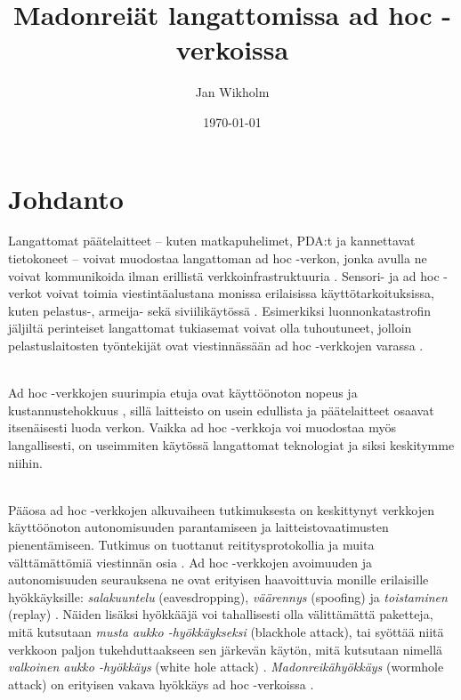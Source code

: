 \documentclass[finnish]{tktltiki2}
\title{Madonreiät langattomissa ad hoc -verkoissa}
\author{Jan Wikholm}
\date{\today}
\theoremstyle{definition}
\theoremstyle{remark}
\begin{document}

\frontmatter      %

\maketitle        %
\makeabstract     %

\tableofcontents  %


\mainmatter       %

\section{Johdanto}



Langattomat päätelaitteet -- kuten matkapuhelimet, PDA:t ja kannettavat tietokoneet -- voivat muodostaa langattoman ad hoc -verkon, jonka avulla ne voivat kommunikoida ilman erillistä verkkoinfrastruktuuria \cite{delphi}. Sensori- ja ad hoc -verkot voivat toimia viestintäalustana monissa erilaisissa käyttötarkoituksissa, kuten pelastus-, armeija- \cite{leashes} sekä  siviilikäytössä \cite{liteworp}. Esimerkiksi luonnonkatastrofin jäljiltä perinteiset langattomat tukiasemat voivat olla tuhoutuneet, jolloin pelastuslaitosten työntekijät ovat viestinnässään ad hoc -verkkojen varassa \cite{leashes}.

\noindent \\
Ad hoc -verkkojen suurimpia etuja ovat käyttöönoton nopeus ja kustannustehokkuus \cite{delphi,leashes}, sillä laitteisto on usein edullista ja päätelaitteet osaavat itsenäisesti luoda verkon. Vaikka ad hoc -verkkoja voi muodostaa myös langallisesti, on useimmiten käytössä langattomat teknologiat \cite{leashes} ja siksi keskitymme niihin.

\noindent \\
Pääosa ad hoc -verkkojen alkuvaiheen tutkimuksesta on keskittynyt verkkojen käyttöönoton autonomisuuden parantamiseen ja laitteistovaatimusten pienentämiseen. Tutkimus on tuottanut reititysprotokollia ja muita välttämättömiä viestinnän osia \cite{liteworp}. Ad hoc -verkkojen avoimuuden ja autonomisuuden seurauksena ne ovat erityisen haavoittuvia monille erilaisille hyökkäyksille: \emph{salakuuntelu} (eavesdropping), \emph{väärennys} (spoofing) ja \emph{toistaminen} (replay) \cite{leashes}. Näiden lisäksi hyökkääjä voi tahallisesti olla välittämättä paketteja, mitä kutsutaan \emph{musta aukko -hyökkäykseksi} (blackhole attack), tai syöttää niitä verkkoon paljon tukehduttaakseen sen järkevän käytön, mitä kutsutaan nimellä \emph{valkoinen aukko -hyökkäys} (white hole attack) \cite{delphi}. \emph{Madonreikähyökkäys} (wormhole attack) on erityisen vakava hyökkäys ad hoc -verkoissa \cite{liteworp}.
\end{document}
